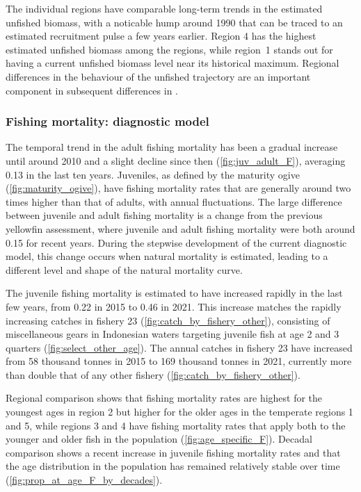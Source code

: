 The individual regions have comparable long-term trends in the estimated unfished biomass, with a noticable hump around 1990 that can be traced to an estimated recruitment pulse a few years earlier. Region 4 has the highest estimated unfished biomass among the regions, while region~1 stands out for having a current unfished biomass level near its historical maximum. Regional differences in the behaviour of the unfished trajectory are an important component in subsequent differences in \sbsbfo.

\subsubsection{Fishing mortality: diagnostic model}
\label{sec:fish_mortality_diag}

The temporal trend in the adult fishing mortality has been a gradual increase until around 2010 and a slight decline since then (\autoref{fig:juv_adult_F}), averaging 0.13 in the last ten years. Juveniles, as defined by the maturity ogive (\autoref{fig:maturity_ogive}), have fishing mortality rates that are generally around two times higher than that of adults, with annual fluctuations. The large difference between juvenile and adult fishing mortality is a change from the previous yellowfin assessment, where juvenile and adult fishing mortality were both around 0.15 for recent years. During the stepwise development of the current diagnostic model, this change occurs when natural mortality is estimated, leading to a different level and shape of the natural mortality curve.

The juvenile fishing mortality is estimated to have increased rapidly in the last few years, from 0.22 in 2015 to 0.46 in 2021. This increase matches the rapidly increasing catches in fishery 23 (\autoref{fig:catch_by_fishery_other}), consisting of miscellaneous gears in Indonesian waters targeting juvenile fish at age 2 and 3 quarters (\autoref{fig:select_other_age}). The annual catches in fishery 23 have increased from 58 thousand tonnes in 2015 to 169 thousand tonnes in 2021, currently more than double that of any other fishery (\autoref{fig:catch_by_fishery_other}).

Regional comparison shows that fishing mortality rates are highest for the youngest ages in region 2 but higher for the older ages in the temperate regions 1 and 5, while regions 3 and 4 have fishing mortality rates that apply both to the younger and older fish in the population (\autoref{fig:age_specific_F}). Decadal comparison shows a recent increase in juvenile fishing mortality rates and that the age distribution in the population has remained relatively stable over time (\autoref{fig:prop_at_age_F_by_decades}).

